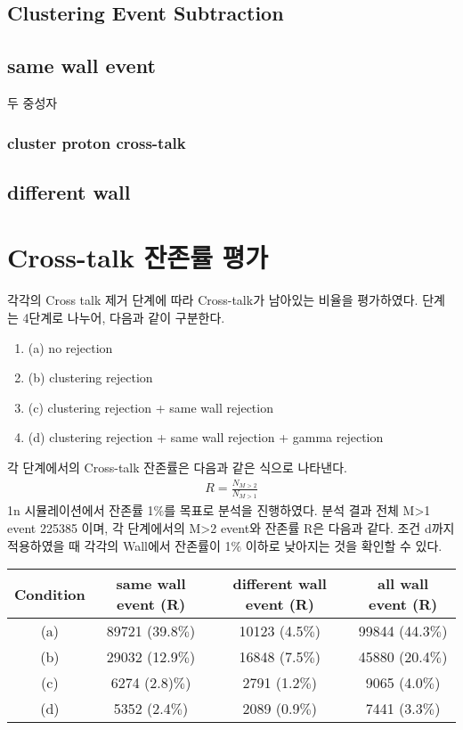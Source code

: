 \subsection{Clustering Event Subtraction}

\subsection{same wall event}
두 중성자

\subsubsection{cluster proton cross-talk}


\subsection{different wall}
\section{Cross-talk 잔존률 평가}
각각의 Cross talk 제거 단계에 따라 Cross-talk가 남아있는 비율을 평가하였다. 단계는 4단계로 나누어, 다음과 같이 구분한다. 
\begin{enumerate}
    \item (a) no rejection
    \item (b) clustering rejection
    \item (c) clustering rejection + same wall rejection
    \item (d) clustering rejection + same wall rejection + gamma rejection
\end{enumerate}
각 단계에서의 Cross-talk 잔존률은 다음과 같은 식으로 나타낸다. \
\begin{align}
    R = \frac{N_{M>2}}{N_{M>1}}
\end{align}
1n 시뮬레이션에서 잔존률 1$\%$를 목표로 분석을 진행하였다. 분석 결과 전체 M>1 event 225385 이며, 각 단계에서의 M>2 event와 잔존률 R은 다음과 같다. 조건 d까지 적용하였을 때 각각의 Wall에서 잔존률이 1$\%$ 이하로 낮아지는 것을 확인할 수 있다.
\begin{center}
    \begin{tabular}[h]{c|c|c|c}
        \hline
        Condition & same wall event (R) & different wall event (R) & all wall event (R)\\
        \hline
        (a) & 89721 (39.8$\%$) & 10123 (4.5$\%$) & 99844 (44.3$\%$) \\
        (b) & 29032 (12.9$\%$) & 16848 (7.5$\%$) & 45880 (20.4$\%$)\\
        (c) & 6274 (2.8)$\%$)   & 2791 (1.2$\%$)& 9065 (4.0$\%$)\\
        (d) & 5352 (2.4$\%$)& 2089 (0.9$\%$)& 7441 (3.3$\%$)\\
        \hline
    \end{tabular}
\end{center}

